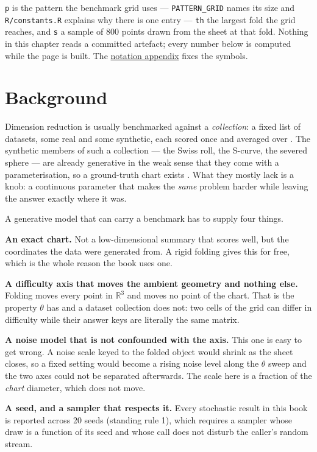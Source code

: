 \documentclass[
  british,
  a4paper,
]{book}
\begin{document}
\texttt{p} is the pattern the benchmark grid uses --- \texttt{PATTERN\_GRID} names its size and
\texttt{R/constants.R} explains why there is one entry --- \texttt{th} the largest fold the grid
reaches, and \texttt{s} a sample of 800 points drawn from the sheet at that
fold. Nothing in this chapter reads a committed artefact; every number below is
computed while the page is built. The \hyperref[notation]{notation appendix} fixes the
symbols.

\section{Background}\label{gen-background}

Dimension reduction is usually benchmarked against a \emph{collection}: a fixed list
of datasets, some real and some synthetic, each scored once and averaged over
\citep{espadoto2021survey}. The synthetic members of such a collection --- the Swiss
roll, the S-curve, the severed sphere --- are already generative in the weak sense
that they come with a parameterisation, so a ground-truth chart exists
\citep{tenenbaum2000isomap, lee2007nonlinear}. What they mostly lack is a knob: a
continuous parameter that makes the \emph{same} problem harder while leaving the
answer exactly where it was.

A generative model that can carry a benchmark has to supply four things.

\textbf{An exact chart.} Not a low-dimensional summary that scores well, but the
coordinates the data were generated from. A rigid folding gives this for free,
which is the whole reason the book uses one.

\textbf{A difficulty axis that moves the ambient geometry and nothing else.} Folding
moves every point in \(\mathbb{R}^3\) and moves no point of the chart. That is the
property \(\theta\) has and a dataset collection does not: two cells of the grid
can differ in difficulty while their answer keys are literally the same matrix.

\textbf{A noise model that is not confounded with the axis.} This one is easy to get
wrong. A noise scale keyed to the folded object would shrink as the sheet
closes, so a fixed setting would become a rising noise level along the \(\theta\)
sweep and the two axes could not be separated afterwards. The scale here is a
fraction of the \emph{chart} diameter, which does not move.

\textbf{A seed, and a sampler that respects it.} Every stochastic result in this book
is reported across 20 seeds (standing rule 1), which requires a sampler
whose draw is a function of its seed and whose call does not disturb the
caller's random stream.
\end{document}
